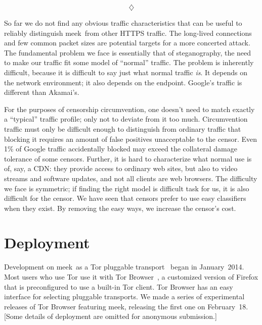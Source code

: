 \documentclass[conference]{IEEEtran}
\newcommand{\meek}{meek\xspace}
\begin{document}
$$\diamondsuit$$

So far we do not find any obvious traffic characteristics that can be useful to reliably distinguish \meek\
from other HTTPS traffic.
The long-lived connections and few common packet sizes are
potential targets for a more concerted attack.
The fundamental problem we face is essentially that of steganography,
the need to make our traffic fit some model of ``normal'' traffic.
The problem is inherently difficult,
because it is difficult to say just what normal traffic \emph{is}.
It depends on the network environment;
it also depends on the endpoint.
Google's traffic is different than Akamai's.

For the purposes of censorship circumvention,
one doesn't need to match exactly a ``typical'' traffic profile;
only not to deviate from it too much.
Circumvention traffic must only be difficult enough to distinguish from ordinary traffic
that blocking it requires an amount of false positives unacceptable to the censor.
Even 1\% of Google traffic accidentally blocked may exceed the collateral damage tolerance of some censors.
Further, it is hard to characterize what normal use is of, say, a CDN:
they provide access to ordinary web sites,
but also to video streams and software updates,
and not all clients are web browsers.
The difficulty we face is symmetric;
if finding the right model is difficult task for us,
it is also difficult for the censor.
We have seen that censors prefer to use easy classifiers when they exist.
By removing the easy ways, we increase the censor's cost.

\section{Deployment}
\label{sec:deployment}

Development on \meek\ as a Tor pluggable transport~\cite{pt} began in January~2014.
Most users who use Tor use it with Tor Browser~\cite{torbrowser},
a customized version of Firefox that is
preconfigured to use a built-in Tor client.
Tor Browser has an easy interface for selecting pluggable transports.
We made a series of experimental releases of Tor Browser featuring \meek,
releasing the first one on February~18.
[Some details of deployment are omitted for anonymous submission.]
\end{document}
